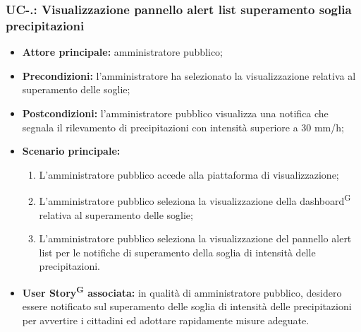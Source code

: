 \documentclass[8pt]{article}
\newcommand{\glossterm}[1]{#1\textsuperscript{G}} %
\begin{document}
\subsubsection*{UC-\theuc .\speconenumber: Visualizzazione pannello alert list superamento soglia precipitazioni}
\begin{itemize}
    \item \textbf{Attore principale:} amministratore pubblico;
    \item \textbf{Precondizioni:} l'amministratore ha selezionato la visualizzazione relativa al superamento delle soglie;
    \item \textbf{Postcondizioni:} l’amministratore pubblico visualizza una notifica che segnala il rilevamento di precipitazioni con intensità superiore a 30 mm/h;
    \item \textbf{Scenario principale:}
        \begin{enumerate}
        \item L’amministratore pubblico accede alla piattaforma di visualizzazione;
        \item L’amministratore pubblico seleziona la visualizzazione della \glossterm{dashboard} relativa al superamento delle soglie;
        \item L'amministratore pubblico seleziona la visualizzazione del pannello alert list per le notifiche di superamento della soglia di intensità delle precipitazioni.
        \end{enumerate}
    \item \textbf{\glossterm{User Story} associata:} in qualità di amministratore pubblico, desidero essere notificato sul superamento delle soglia di intensità delle precipitazioni per avvertire i cittadini ed adottare rapidamente misure adeguate.
\end{itemize}
\end{document}
